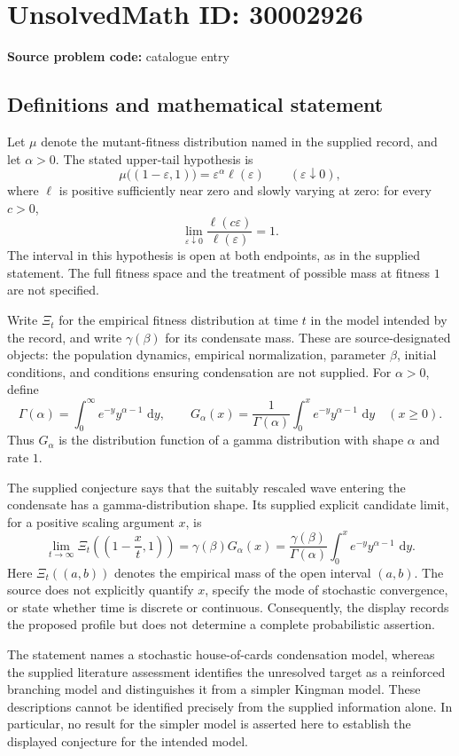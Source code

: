\documentclass[11pt]{article}
\newcommand{\dd}{\,\mathrm{d}}
\begin{document}
\section*{UnsolvedMath ID: 30002926}
\textbf{Source problem code:} catalogue entry
\subsection{Definitions and mathematical statement}
Let \(\mu\) denote the mutant-fitness distribution named in the supplied record, and let \(\alpha>0\). The stated upper-tail hypothesis is
\[
\mu\bigl((1-\varepsilon,1)\bigr)=\varepsilon^\alpha\ell(\varepsilon)
\qquad (\varepsilon\downarrow0),
\]
where \(\ell\) is positive sufficiently near zero and slowly varying at zero: for every \(c>0\),
\[
\lim_{\varepsilon\downarrow0}\frac{\ell(c\varepsilon)}{\ell(\varepsilon)}=1.
\]
The interval in this hypothesis is open at both endpoints, as in the supplied statement. The full fitness space and the treatment of possible mass at fitness \(1\) are not specified.

Write \(\Xi_t\) for the empirical fitness distribution at time \(t\) in the model intended by the record, and write \(\gamma(\beta)\) for its condensate mass. These are source-designated objects: the population dynamics, empirical normalization, parameter \(\beta\), initial conditions, and conditions ensuring condensation are not supplied. For \(\alpha>0\), define
\[
\Gamma(\alpha)=\int_0^\infty e^{-y}y^{\alpha-1}\,\dd y,
\qquad
G_\alpha(x)=\frac{1}{\Gamma(\alpha)}\int_0^x e^{-y}y^{\alpha-1}\,\dd y
\quad (x\geq0).
\]
Thus \(G_\alpha\) is the distribution function of a gamma distribution with shape \(\alpha\) and rate \(1\).

The supplied conjecture says that the suitably rescaled wave entering the condensate has a gamma-distribution shape. Its supplied explicit candidate limit, for a positive scaling argument \(x\), is
\[
\lim_{t\to\infty}\Xi_t\!\left(\left(1-\frac{x}{t},1\right)\right)
=\gamma(\beta)G_\alpha(x)
=\frac{\gamma(\beta)}{\Gamma(\alpha)}\int_0^x e^{-y}y^{\alpha-1}\,\dd y.
\]
Here \(\Xi_t((a,b))\) denotes the empirical mass of the open interval \((a,b)\). The source does not explicitly quantify \(x\), specify the mode of stochastic convergence, or state whether time is discrete or continuous. Consequently, the display records the proposed profile but does not determine a complete probabilistic assertion.

The statement names a stochastic house-of-cards condensation model, whereas the supplied literature assessment identifies the unresolved target as a reinforced branching model and distinguishes it from a simpler Kingman model. These descriptions cannot be identified precisely from the supplied information alone. In particular, no result for the simpler model is asserted here to establish the displayed conjecture for the intended model.
\end{document}
